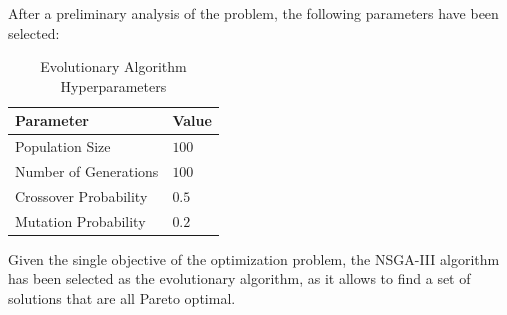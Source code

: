 After a preliminary analysis of the problem, the following parameters have been selected:

\begin{table}
    \centering
    \begin{tabular}{ll}
        \toprule
        \textbf{Parameter}    & \textbf{Value} \\
        \midrule
        Population Size       & $100$          \\
        Number of Generations & $100$          \\
        Crossover Probability & $0.5$          \\
        Mutation Probability  & $0.2$          \\
        \bottomrule
    \end{tabular}
    \caption{Evolutionary Algorithm Hyperparameters}
\end{table}

Given the single objective of the optimization problem, the \ac{NSGA}-III algorithm has been selected as the evolutionary algorithm, as it allows to find a set of solutions that are all Pareto optimal.